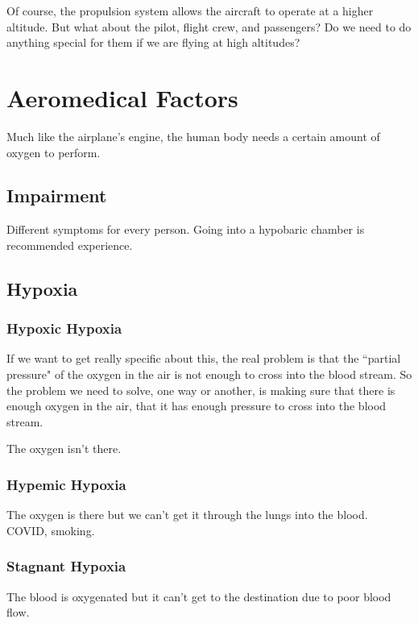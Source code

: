 Of course, the propulsion system allows the aircraft to operate at a higher altitude. But what about the pilot, flight crew, and passengers? Do we need to do anything special for them if we are flying at high altitudes?

\section{Aeromedical Factors}

Much like the airplane's engine, the human body needs a certain amount of oxygen to perform.

\subsection{Impairment}

Different symptoms for every person. Going into a hypobaric chamber is recommended experience.

\subsection{Hypoxia}

\subsubsection{Hypoxic Hypoxia}

If we want to get really specific about this, the real problem is that the ``partial pressure" of the oxygen in the air is not enough to cross into the blood stream. So the problem we need to solve, one way or another, is making sure that there is enough oxygen in the air, that it has enough pressure to cross into the blood stream.

The oxygen isn't there.

\subsubsection{Hypemic Hypoxia}

The oxygen is there but we can't get it through the lungs into the blood. COVID, smoking.

\subsubsection{Stagnant Hypoxia}

The blood is oxygenated but it can't get to the destination due to poor blood flow.

